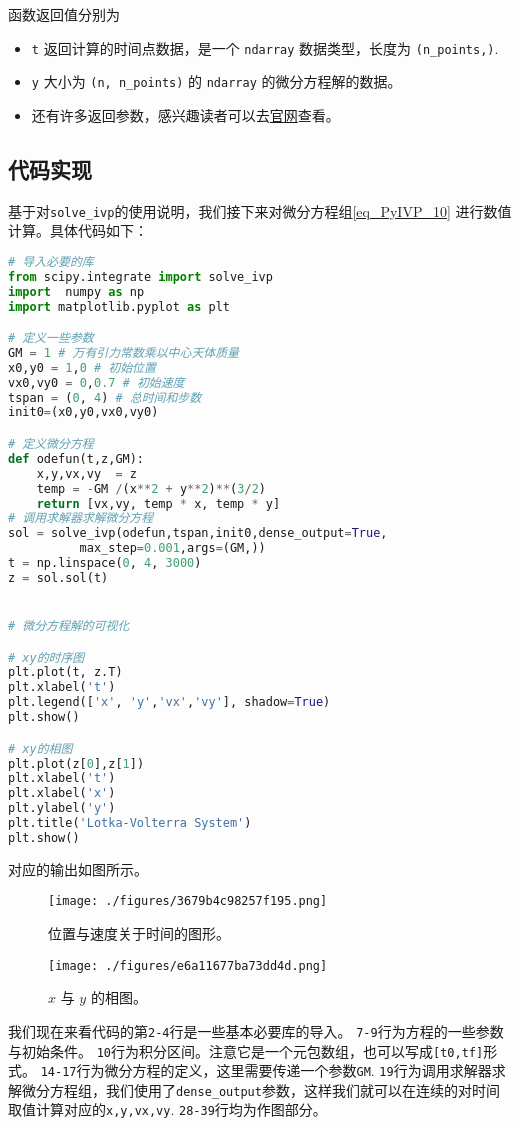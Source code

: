 函数返回值分别为
\begin{itemize}
\item  \verb`t` 返回计算的时间点数据，是一个 \verb`ndarray` 数据类型，长度为 \verb`(n_points,)`.
\item \verb`y` 大小为 \verb`(n, n_points)` 的 \verb`ndarray` 的微分方程解的数据。
\item 还有许多返回参数，感兴趣读者可以去\href{https://scipy.github.io/devdocs/reference/generated/scipy.integrate.solve_ivp.html#r179348322575-7}{官网}查看。
\end{itemize}


\subsection{代码实现}
基于对\verb`solve_ivp`的使用说明，我们接下来对微分方程组\ref{eq_PyIVP_10} 进行数值计算。具体代码如下：
\begin{lstlisting}[language=python]
# 导入必要的库
from scipy.integrate import solve_ivp
import  numpy as np
import matplotlib.pyplot as plt

# 定义一些参数
GM = 1 # 万有引力常数乘以中心天体质量
x0,y0 = 1,0 # 初始位置
vx0,vy0 = 0,0.7 # 初始速度
tspan = (0, 4) # 总时间和步数
init0=(x0,y0,vx0,vy0)

# 定义微分方程
def odefun(t,z,GM):
    x,y,vx,vy  = z
    temp = -GM /(x**2 + y**2)**(3/2)
    return [vx,vy, temp * x, temp * y]
# 调用求解器求解微分方程
sol = solve_ivp(odefun,tspan,init0,dense_output=True,
          max_step=0.001,args=(GM,))
t = np.linspace(0, 4, 3000)
z = sol.sol(t)


# 微分方程解的可视化

# xy的时序图
plt.plot(t, z.T)
plt.xlabel('t')
plt.legend(['x', 'y','vx','vy'], shadow=True)
plt.show()

# xy的相图
plt.plot(z[0],z[1])
plt.xlabel('t')
plt.xlabel('x')
plt.ylabel('y')
plt.title('Lotka-Volterra System')
plt.show()
\end{lstlisting}

对应的输出如图所示。
\begin{figure}[ht]
\centering
\texttt{[image: ./figures/3679b4c98257f195.png]}
\caption{位置与速度关于时间的图形。} \label{fig_PyIVP_1}
\end{figure}

\begin{figure}[ht]
\centering
\texttt{[image: ./figures/e6a11677ba73dd4d.png]}
\caption{$x$ 与 $y$ 的相图。} \label{fig_PyIVP_2}
\end{figure}

我们现在来看代码的第\verb`2-4`行是一些基本必要库的导入。 
\verb`7-9`行为方程的一些参数与初始条件。
\verb`10`行为积分区间。注意它是一个元包数组，也可以写成\verb`[t0,tf]`形式。
\verb`14-17`行为微分方程的定义，这里需要传递一个参数\verb`GM`.
\verb`19`行为调用求解器求解微分方程组，我们使用了\verb`dense_output`参数，这样我们就可以在连续的对时间取值计算对应的\verb`x,y,vx,vy`. 
\verb`28-39`行均为作图部分。
